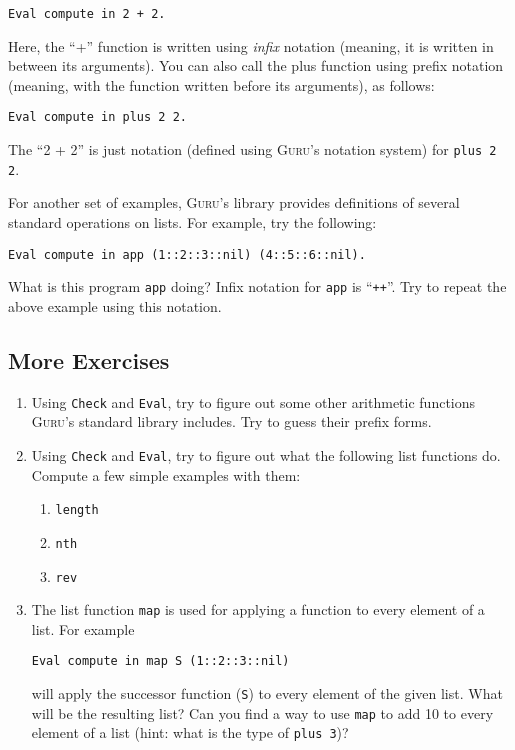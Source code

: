 \documentclass{book}[12pt]
\newcommand{\guru}[0]{\textsc{Guru}}
\begin{document}
\begin{verbatim}
Eval compute in 2 + 2.
\end{verbatim}

\noindent Here, the ``+'' function is written using \emph{infix}
notation (meaning, it is written in between its arguments).  You can
also call the plus function using prefix notation (meaning, with the
function written before its arguments), as follows:

\begin{verbatim}
Eval compute in plus 2 2.
\end{verbatim}

\noindent The ``2 + 2'' is just notation (defined using \guru's notation
system) for \texttt{plus 2 2}.

\noindent For another set of examples, \guru's library provides definitions
of several standard operations on lists.  For example, try the following:

\begin{verbatim}
Eval compute in app (1::2::3::nil) (4::5::6::nil).
\end{verbatim}

\noindent What is this program \texttt{app} doing?  Infix notation for
\texttt{app} is ``\texttt{++}''.  Try to repeat the above example
using this notation.

\subsection{More Exercises}

\begin{enumerate}
\item Using \texttt{Check} and \texttt{Eval}, try to figure out some
other arithmetic functions \guru's standard library includes.  Try to
guess their prefix forms.

\item Using \texttt{Check} and \texttt{Eval}, try to figure out what
the following list functions do.  Compute a few simple examples with
them:
\begin{enumerate}
\item \texttt{length}
\item \texttt{nth}
\item \texttt{rev}
\end{enumerate}
\item The list function \texttt{map} is used for applying a function
to every element of a list.  For example

\begin{verbatim}
Eval compute in map S (1::2::3::nil)
\end{verbatim}

\noindent will apply the successor function (\texttt{S}) to every element
of the given list.  What will be the resulting list?  Can you find a way
to use \texttt{map} to add 10 to every element of a list (hint: what is
the type of \texttt{plus 3})?
\end{enumerate}
\end{document}
